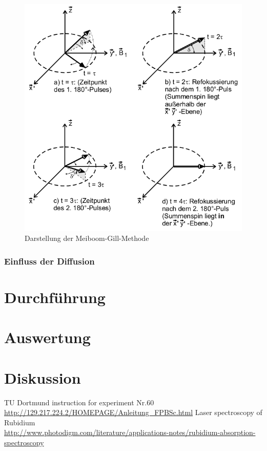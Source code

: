 \begin{figure}[t]
 \includegraphics[width=.7\textwidth]{../pics/MG.png}
 \caption{Darstellung der Meiboom-Gill-Methode}
 \label{pic:MGmeth}
\end{figure}

\subsubsection{Einfluss der Diffusion}


\section{Durchführung}
\section{Auswertung}
\section{Diskussion}



 \begin{thebibliography}{WissOnl}
 	 TU Dortmund instruction for experiment Nr.60 \url{http://129.217.224.2/HOMEPAGE/Anleitung_FPBSc.html}
 	 Laser spectroscopy of Rubidium \\ \url{http://www.photodigm.com/literature/applications-notes/rubidium-absorption-spectroscopy}
 \end{thebibliography}





